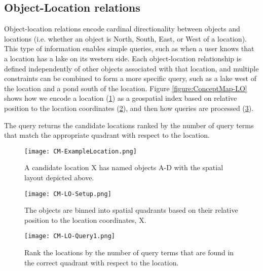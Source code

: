 \subsection{Object-Location relations}
Object-location relations encode cardinal directionality between objects and locations (i.e. whether an object is North, South, East, or West of a location). 
This type of information enables simple queries, such as when a user knows that a location has a lake on its western side. 
Each object-location relationship is defined independently of other objects associated with that location, and multiple constraints can be combined to form a more specific query, such as a lake west of the location and a pond south of the location.
Figure \ref{figure:ConceptMap-LO} shows how we encode a location (\ref{fig:CM-LO-Example}) as a geospatial index based on relative position to the location coordinates (\ref{fig:CM-LO-Setup}), and then how queries are processed (\ref{fig:CM-LO-Query}).

The query returns the candidate locations ranked by the number of query terms that match the appropriate quadrant with respect to the location. 

\begin{figure*}[h]
    \centering
    \begin{subfigure}[t]{.25\textwidth}
        \texttt{[image: CM-ExampleLocation.png]}
        \caption{\small A candidate location X has named objects A-D with the spatial layout depicted above.} 
        \label{fig:CM-LO-Example}
    \end{subfigure}
    \hfill
    \begin{subfigure}[t]{.25\textwidth}
        \texttt{[image: CM-LO-Setup.png]}
        \caption{\small The objects are binned into spatial quadrants based on their relative position to the location coordinates, X.} 
        \label{fig:CM-LO-Setup}
    \end{subfigure}
    \hfill
        \begin{subfigure}[t]{.25\textwidth}
        \texttt{[image: CM-LO-Query1.png]}
        \caption{\small Rank the locations by the number of query terms that are found in the correct quadrant with respect to the location.}
        \label{fig:CM-LO-Query}
    \hfill
    \end{subfigure}
    \caption{\textbf{Object-Location Search Method. A Location-centric data structure (Figure \ref{fig:CM-LO-Setup}) is generated based on the cardinal relations between the objects and the location (Figure \ref{fig:CM-LO-Example}). Then a pictorial query is matched against the structure (Figure \ref{fig:CM-LO-Query}).}}\label{figure:ConceptMap-LO} 
\end{figure*}



